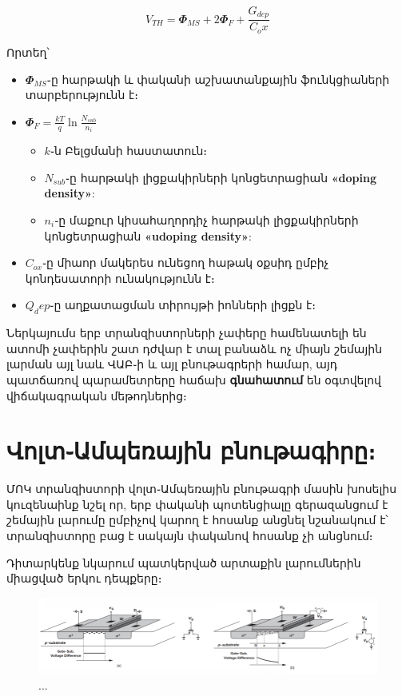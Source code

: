 \documentclass[
]{book}
\providecommand{\tightlist}{%
  \setlength{\itemsep}{0pt}\setlength{\parskip}{0pt}}
\theoremstyle{definition}
\theoremstyle{definition}
\theoremstyle{definition}
\theoremstyle{definition}
\theoremstyle{remark}
\begin{document}
\[V_{TH} = 𝜱_{MS} + 2 𝜱_F + \frac{G_{dep}}{C_ox}\]

Որտեղ՝

\begin{itemize}
\tightlist
\item
  \(𝜱_{MS}\)֊ը հարթակի և փականի աշխատանքային ֆունկցիաների տարբերությունն է։
\item
  \(𝜱_F = \frac{kT}{q} \ln{\frac{N_{sub}}{n_i}}\)

  \begin{itemize}
  \tightlist
  \item
    \(k\)֊ն Բելցմանի հաստատուն։
  \item
    \(N_{sub}\)֊ը հարթակի լիցքակիրների կոնցետրացիան \textbf{«doping density»}:
  \item
    \(n_i\)֊ը մաքուր կիսահաղորդիչ հարթակի լիցքակիրների կոնցետրացիան \textbf{«udoping density»}:
  \end{itemize}
\item
  \(C_{ox}\)֊ը միաոր մակերես ունեցող հաթակ օքսիդ ըմբիչ կոնդեսատորի ունակությունն է։
\item
  \(Q_dep\)֊ը աղքատացման տիրույթի իոնների լիցքն է։
\end{itemize}

Ներկայումս երբ տրանզիստորների չափերը համենատելի են ատոմի չափերին շատ դժվար է տալ բանաձև
ոչ միայն շեմային լարման այլ նաև ՎԱԲ֊ի և այլ բնութագրերի համար, այդ պատճառով պարամետրերը
հաճախ \textbf{գնահատում} են օգտվելով վիճակագրական մեթոդներից։

\hypertarget{ux57eux578ux56cux57fux561ux574ux57aux565ux57cux561ux575ux56bux576-ux562ux576ux578ux582ux569ux561ux563ux56bux580ux568}{%
\section{Վոլտ֊Ամպեռային բնութագիրը։}\label{ux57eux578ux56cux57fux561ux574ux57aux565ux57cux561ux575ux56bux576-ux562ux576ux578ux582ux569ux561ux563ux56bux580ux568}}

ՄՈԿ տրանզիստորի վոլտ֊Ամպեռային բնութագրի մասին խոսելիս կուզենաինք նշել որ, երբ փականի
պոտենցիալը գերազանցում է շեմային լարումը ըմբիչով կարող է հոսանք անցնել նշանակում է՝
տրանզիստորը բաց է սակայն փականով հոսանք չի անցնում։

Դիտարկենք նկարում պատկերված արտաքին լարումներին միացված երկու դեպքերը։

\begin{figure}

{\centering \includegraphics[width=1\linewidth]{imige/va} 

}

\caption{...}\label{fig:unnamed-chunk-3}
\end{figure}
\end{document}
